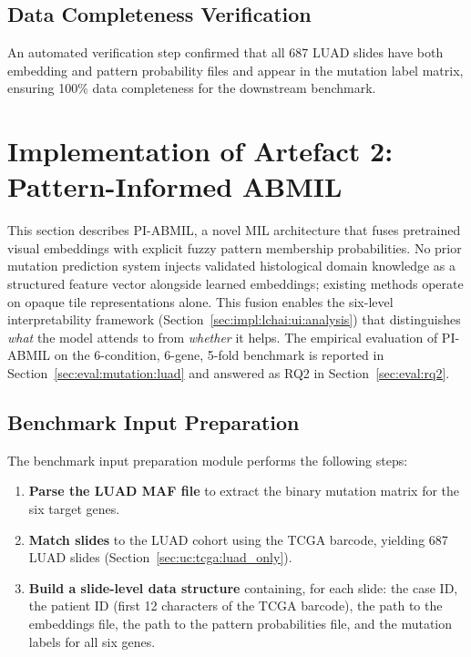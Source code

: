 \subsection{Data Completeness Verification}
\label{sec:impl:data_completeness}

An automated verification step confirmed that all 687 LUAD slides have
both embedding and pattern probability files and appear in the mutation
label matrix, ensuring 100\% data completeness for the downstream
benchmark.

\section{Implementation of Artefact 2: Pattern-Informed ABMIL}
\label{sec:impl:mutation}

This section describes PI-ABMIL, a novel MIL architecture that fuses
pretrained visual embeddings with explicit fuzzy pattern membership
probabilities.
No prior mutation prediction system injects validated histological
domain knowledge as a structured feature vector alongside learned
embeddings; existing methods operate on opaque tile representations
alone.
This fusion enables the six-level interpretability framework
(Section~\ref{sec:impl:lchai:ui:analysis}) that distinguishes
\emph{what} the model attends to from \emph{whether} it helps.
The empirical evaluation of PI-ABMIL on the 6-condition,
6-gene, 5-fold benchmark is reported in
Section~\ref{sec:eval:mutation:luad} and answered as RQ2 in
Section~\ref{sec:eval:rq2}.

\subsection{Benchmark Input Preparation}
\label{sec:impl:mutation:prep}

The benchmark input preparation module performs
the following steps:

\begin{enumerate}
    \item \textbf{Parse the LUAD MAF file} to extract the binary
    mutation matrix for the six target genes.
    \item \textbf{Match slides} to the LUAD cohort using the TCGA
    barcode, yielding 687 LUAD slides
    (Section~\ref{sec:uc:tcga:luad_only}).
    \item \textbf{Build a slide-level data structure}
    containing, for each slide: the case ID, the patient ID (first 12
    characters of the TCGA barcode), the path to the embeddings file,
    the path to the pattern probabilities file, and the mutation labels
    for all six genes.
\end{enumerate}

